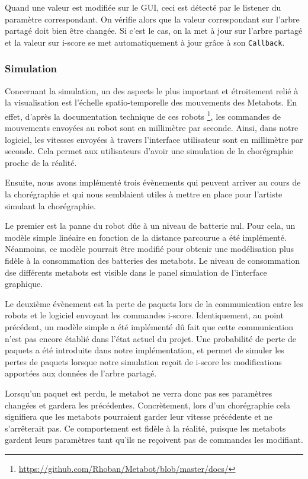 Quand une valeur est modifiée sur le GUI, ceci est détecté par le listener du paramètre correspondant. On vérifie alors que la valeur correspondant sur l'arbre partagé doit bien être changée. Si c'est le cas, on la met à jour sur l'arbre partagé et la valeur sur i-score se met automatiquement à jour grâce à son \verb|Callback|. 

\subsubsection{Simulation}

Concernant la simulation, un des aspects le plus important et étroitement relié à la visualisation est l'échelle spatio-temporelle des mouvements des Metabots. En effet, d'après la documentation technique de ces robots \footnote{\url{https://github.com/Rhoban/Metabot/blob/master/docs/}}, les commandes de mouvements envoyées au robot sont en millimètre par seconde. Ainsi, dans notre logiciel, les vitesses envoyées à travers l'interface utilisateur sont en millimètre par seconde. Cela permet aux utilisateurs d'avoir une simulation de la chorégraphie proche de la réalité.

Ensuite, nous avons implémenté trois évènements qui peuvent arriver au cours de la chorégraphie et qui nous semblaient utiles à mettre en place pour l'artiste simulant la chorégraphie. 

Le premier est la panne du robot dûe à un niveau de batterie nul. Pour cela, un modèle simple linéaire en fonction de la distance parcourue a été implémenté. Néanmoins, ce modèle pourrait être modifié pour obtenir une modélisation plus fidèle à la consommation des batteries des metabots. Le niveau de consommation dse différents metabots est visible dans le panel simulation de l'interface graphique. 

Le deuxième évènement est la perte de paquets lors de la communication entre les robots et le logiciel envoyant les commandes i-score. Identiquement, au point précédent, un modèle simple a été implémenté dû fait que cette communication n'est pas encore établié dans l'état actuel du projet. Une probabilité de perte de paquets a été introduite dans notre implémentation, et permet de simuler les pertes de paquets lorsque notre simulation reçoit de i-score les modifications apportées aux données de l'arbre partagé. 

Lorsqu'un paquet est perdu, le metabot ne verra donc pas ses paramètres changées et gardera les précédentes. Concrètement, lors d'un chorégraphie cela signifiera que les metabots pourraient garder leur vitesse précédente et ne s'arrêterait pas. Ce comportement est fidèle à la réalité, puisque les metabots gardent leurs paramètres tant qu'ils ne reçoivent pas de commandes les modifiant. 

